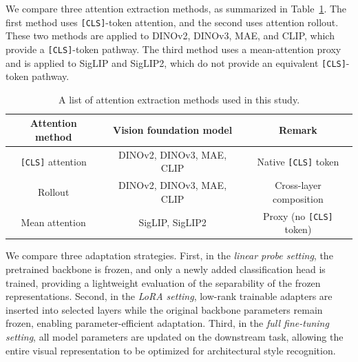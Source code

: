 \documentclass[lineno,pdflatex,sn-mathphys-num]{sn-jnl}%
\theoremstyle{thmstyleone}%
\theoremstyle{thmstyletwo}%
\theoremstyle{thmstylethree}%
\begin{document}
We compare three attention extraction methods, as summarized in Table~\ref{table attention method list}. The first method uses \texttt{[CLS]}-token attention, and the second uses attention rollout. These two methods are applied to DINOv2, DINOv3, MAE, and CLIP, which provide a \texttt{[CLS]}-token pathway. The third method uses a mean-attention proxy and is applied to SigLIP and SigLIP2, which do not provide an equivalent \texttt{[CLS]}-token pathway.


\begin{table}[!h]
\centering \caption{A list of attention extraction methods used in this study. \label{table attention method list}}
\begin{tabular}{ccc}
\toprule
Attention method & Vision foundation model & Remark \\ \midrule
\texttt{[CLS]} attention & DINOv2, DINOv3, MAE, CLIP & Native \texttt{[CLS]} token \\
Rollout & DINOv2, DINOv3, MAE, CLIP & Cross-layer composition \\
Mean attention & SigLIP, SigLIP2 & Proxy (no \texttt{[CLS]} token) \\
\bottomrule
\end{tabular}
\end{table}

We compare three adaptation strategies. First, in the \textit{linear probe setting}, the pretrained backbone is frozen, and only a newly added classification head is trained, providing a lightweight evaluation of the separability of the frozen representations. Second, in the \textit{LoRA setting}, low-rank trainable adapters are inserted into selected layers while the original backbone parameters remain frozen, enabling parameter-efficient adaptation. Third, in the \textit{full fine-tuning setting}, all model parameters are updated on the downstream task, allowing the entire visual representation to be optimized for architectural style recognition.


\end{document}
